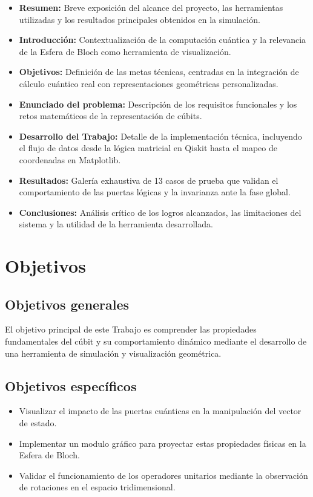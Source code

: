 \documentclass[11pt,a4paper,spanish]{book}
\begin{document}
\begin{itemize}
    \item \textbf{Resumen:} Breve exposición del alcance del proyecto, las herramientas utilizadas y los resultados principales obtenidos en la simulación.
    \item \textbf{Introducción:} Contextualización de la computación cuántica y la relevancia de la Esfera de Bloch como herramienta de visualización.
    \item \textbf{Objetivos:} Definición de las metas técnicas, centradas en la integración de cálculo cuántico real con representaciones geométricas personalizadas.
    \item \textbf{Enunciado del problema:} Descripción de los requisitos funcionales y los retos matemáticos de la representación de cúbits.
    \item \textbf{Desarrollo del Trabajo:} Detalle de la implementación técnica, incluyendo el flujo de datos desde la lógica matricial en Qiskit hasta el mapeo de coordenadas en Matplotlib.
    \item \textbf{Resultados:} Galería exhaustiva de 13 casos de prueba que validan el comportamiento de las puertas lógicas y la invarianza ante la fase global.
    \item \textbf{Conclusiones:} Análisis crítico de los logros alcanzados, las limitaciones del sistema y la utilidad de la herramienta desarrollada.
\end{itemize}
\chapter{Objetivos}

\section{Objetivos generales}
El objetivo principal de este Trabajo es comprender las propiedades fundamentales del cúbit y su comportamiento dinámico mediante el desarrollo de una herramienta de simulación y visualización geométrica.

\section{Objetivos específicos}
\begin{itemize}
    \item Visualizar el impacto de las puertas cuánticas en la manipulación del vector de estado.
    \item Implementar un modulo gráfico para proyectar estas propiedades físicas en la Esfera de Bloch.
    \item Validar el funcionamiento de los operadores unitarios mediante la observación de rotaciones en el espacio tridimensional.
\end{itemize}
\end{document}
